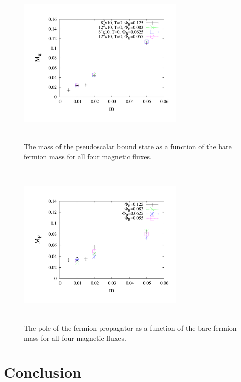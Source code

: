 \documentclass[aps,prd,twocolumn,showpacs,superscriptaddress,groupedaddress]{revtex4}  %
\begin{document}
\begin{figure}
  \includegraphics[height=8cm,width=8cm]{ps_mt_vs_m_2exp_graphene_paper.pdf} \hspace{-1cm}
\caption{The mass of the pseudoscalar bound state as a function of the bare fermion mass for all four magnetic fluxes.}
\label{MPSvsm}
\end{figure}

\begin{figure}
  \includegraphics[height=8cm,width=8cm]{ferm_mt_vs_m_graphene_paper.pdf} \hspace{-1cm}
\caption{The pole of the fermion propagator as a function of the bare fermion mass for all four magnetic fluxes.}
\label{MFvsm}
\end{figure}

\section{\label{sec:Conclusion}Conclusion}
\end{document}

